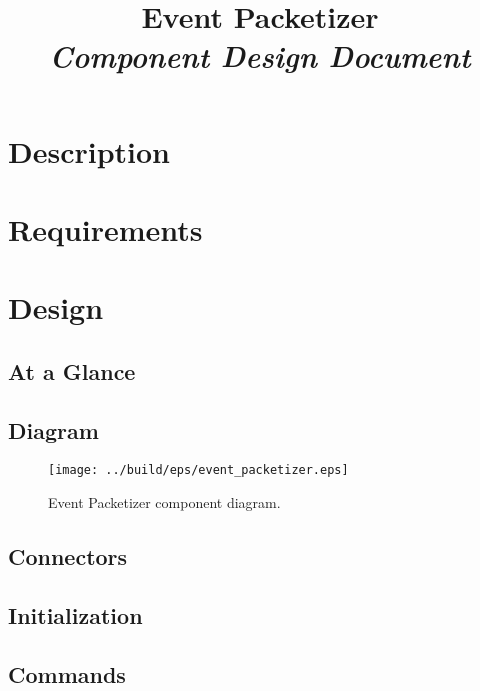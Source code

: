



\title{\textbf{Event Packetizer} \\
\large\textit{Component Design Document}}
\date{}
\maketitle

\section{Description}


\section{Requirements}


\section{Design}

\subsection{At a Glance}


\subsection{Diagram}
\begin{figure}[H]
  \texttt{[image: ../build/eps/event\_packetizer.eps]}
  \caption{Event Packetizer component diagram.}
\end{figure}

\subsection{Connectors}


\subsection{Initialization}


\subsection{Commands}

